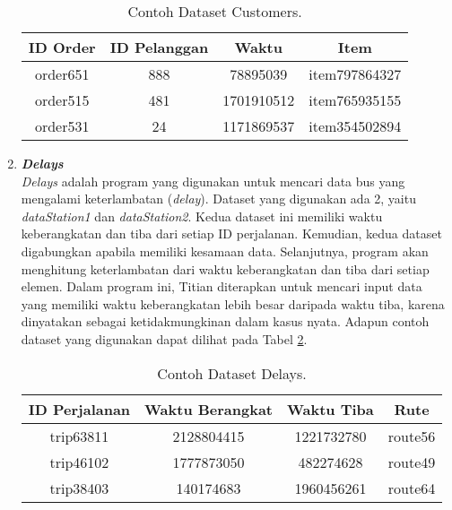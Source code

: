 \begin{enumerate}
            \begin{longtable}{|c|c|c|c|}
                  \caption{Contoh Dataset Customers.}
                  \label{tb:customersdataset} \\
                  \hline
                  \rowcolor[HTML]{C0C0C0}
                  \textbf{ID Order} & \textbf{ID Pelanggan} & \textbf{Waktu} & \textbf{Item} \\
                  \hline
                  order651 & 888 & 78895039 & item797864327 \\
                  order515 & 481 & 1701910512 & item765935155 \\
                  order531 & 24 & 1171869537 & item354502894 \\
                  \hline
            \end{longtable}
            
      \item \emph{\textbf{Delays}} \\
            \emph{Delays} adalah program yang digunakan untuk mencari data bus yang mengalami keterlambatan (\emph{delay}). Dataset yang digunakan ada 2, yaitu \emph{dataStation1} dan \emph{dataStation2}. Kedua dataset ini memiliki waktu keberangkatan dan tiba dari setiap ID perjalanan. Kemudian, kedua dataset digabungkan apabila memiliki kesamaan data. Selanjutnya, program akan menghitung keterlambatan dari waktu keberangkatan dan tiba dari setiap elemen. Dalam program ini, Titian diterapkan untuk mencari input data yang memiliki waktu keberangkatan lebih besar daripada waktu tiba, karena dinyatakan sebagai ketidakmungkinan dalam kasus nyata.
            Adapun contoh dataset yang digunakan dapat 
            dilihat pada Tabel \ref{tb:delaysdataset}.

            \begin{longtable}{|c|c|c|c|}
                  \caption{Contoh Dataset Delays.}
                  \label{tb:delaysdataset} \\
                  \hline
                  \rowcolor[HTML]{C0C0C0}
                  \textbf{ID Perjalanan} & \textbf{Waktu Berangkat} & \textbf{Waktu Tiba} & \textbf{Rute} \\
                  \hline
                  trip63811 & 2128804415 & 1221732780 & route56 \\
                  trip46102 & 1777873050 & 482274628 & route49 \\
                  trip38403 & 140174683 & 1960456261 & route64 \\
                  \hline
            \end{longtable}


\end{enumerate}
